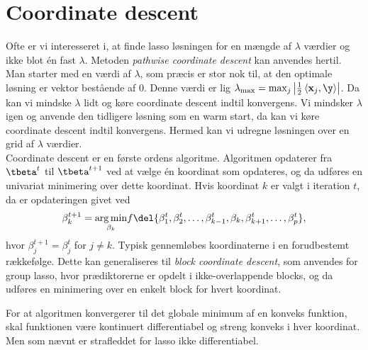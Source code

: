 \section{Coordinate descent}
Ofte er vi interesseret i, at finde lasso løsningen for en mængde af \(\lambda\) værdier og ikke blot én fast \(\lambda\).
Metoden \textit{pathwise coordinate descent} kan anvendes hertil.
Man starter med en værdi af \(\lambda\), som præcis er stor nok til, at den optimale løsning er vektor bestående af \(0\).
Denne værdi er lig \(\lambda_{\max}=\max_j \left\vert \frac{1}{2} \left\langle \mathbf{x}_j, \y \right\rangle \right\vert\).
Da kan vi mindske \(\lambda\) lidt og køre coordinate descent indtil konvergens.
Vi mindsker \(\lambda\) igen og anvende den tidligere løsning som en warm start, da kan vi køre coordinate descent indtil konvergens.
Hermed kan vi udregne løsningen over en grid af \(\lambda\) værdier. \\









%
Coordinate descent er en første ordens algoritme.
Algoritmen opdaterer fra \(\tbeta^t\) til \(\tbeta^{t+1}\) ved at vælge én koordinat som opdateres, og da udføres en univariat minimering over dette koordinat.
Hvis koordinat $k$ er valgt i iteration $t$, da er opdateringen givet ved
\begin{align}
\beta_k^{t+1} =\underset{ \beta_k}{\arg \min}  f\del{ \beta_1^t, \beta_2^t, \dots, \beta_{k-1}^t, \beta_k, \beta_{k+1}^t, \dots, \beta_p^t  }, \label{eq:5.36}
\end{align}
hvor $\beta_j^{t+1} = \beta_j^t$ for $j \neq k$. 
Typisk gennemløbes koordinaterne i en forudbestemt rækkefølge.
Dette kan generaliseres til \textit{block coordinate descent}, som anvendes for group lasso, hvor prædiktorerne er opdelt i ikke-overlappende blocks, og da udføres en minimering over en enkelt block for hvert koordinat.

For at algoritmen konvergerer til det globale minimum af en konveks funktion, skal funktionen være kontinuert differentiabel og streng konveks i hver koordinat. 
Men som nævnt er strafleddet for lasso ikke differentiabel.


